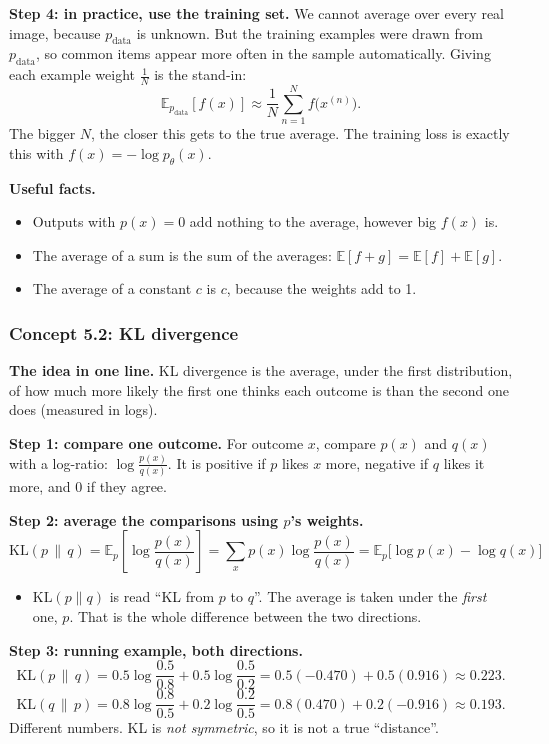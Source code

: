 \documentclass[12pt,a4paper]{article}
\begin{document}
\textbf{Step 4: in practice, use the training set.} We cannot average over every real image, because $p_{\text{data}}$ is unknown. But the training examples were drawn from $p_{\text{data}}$, so common items appear more often in the sample automatically. Giving each example weight $\frac1N$ is the stand-in:
\[
\mathbb{E}_{p_{\text{data}}}[f(x)]\approx\frac1N\sum_{n=1}^{N}f\big(x^{(n)}\big).
\]
The bigger $N$, the closer this gets to the true average. The training loss is exactly this with $f(x)=-\log p_\theta(x)$.

\textbf{Useful facts.}
\begin{itemize}[nosep]
  \item Outputs with $p(x)=0$ add nothing to the average, however big $f(x)$ is.
  \item The average of a sum is the sum of the averages: $\mathbb{E}[f+g]=\mathbb{E}[f]+\mathbb{E}[g]$.
  \item The average of a constant $c$ is $c$, because the weights add to 1.
\end{itemize}

\subsubsection{Concept 5.2: KL divergence}\label{c5-2}

\textbf{The idea in one line.} KL divergence is the average, under the first distribution, of how much more likely the first one thinks each outcome is than the second one does (measured in logs).

\textbf{Step 1: compare one outcome.} For outcome $x$, compare $p(x)$ and $q(x)$ with a log-ratio: $\log\frac{p(x)}{q(x)}$. It is positive if $p$ likes $x$ more, negative if $q$ likes it more, and 0 if they agree.

\textbf{Step 2: average the comparisons using $p$'s weights.}
\[
\mathrm{KL}(p\,\|\,q)=\mathbb{E}_p\!\left[\log\frac{p(x)}{q(x)}\right]=\sum_x p(x)\log\frac{p(x)}{q(x)}=\mathbb{E}_p\big[\log p(x)-\log q(x)\big]
\]
\begin{itemize}[nosep]
  \item $\mathrm{KL}(p\|q)$ is read ``KL from $p$ to $q$''. The average is taken under the \emph{first} one, $p$. That is the whole difference between the two directions.
\end{itemize}

\textbf{Step 3: running example, both directions.}
\[
\mathrm{KL}(p\,\|\,q)=0.5\log\frac{0.5}{0.8}+0.5\log\frac{0.5}{0.2}=0.5(-0.470)+0.5(0.916)\approx0.223 .
\]
\[
\mathrm{KL}(q\,\|\,p)=0.8\log\frac{0.8}{0.5}+0.2\log\frac{0.2}{0.5}=0.8(0.470)+0.2(-0.916)\approx0.193 .
\]
Different numbers. KL is \emph{not symmetric}, so it is not a true ``distance''.
\end{document}
